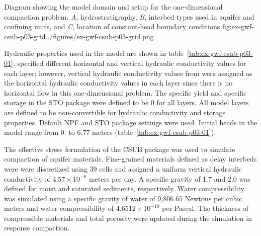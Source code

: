 \begin{StandardFigure}{
                                      Diagram showing the model domain and setup for the one-dimensional 
                                      compaction problem. \textit{A}, hydrostratigraphy, \textit{B}, interbed types 
                                      used in aquifer and confining units, and \textit{C}, location of constant-head 
                                      boundary conditions
                                     }{fig:ex-gwf-csub-p03-grid}{../figures/ex-gwf-csub-p03-grid.png}
\end{StandardFigure}        

 

Hydraulic properties used in the model are shown in table~\ref{tab:ex-gwf-csub-p03-01}.  \cite{sneed2008} specified different horizontal and vertical hydraulic conductivity values for each layer; however, vertical hydraulic conductivity values from \cite{sneed2008} were assigned as the horizontal hydraulic conductivity values in each layer since there is no horizontal flow in this one-dimensional problem. The specific yield and specific storage in the STO package were defined to be 0 for all layers.  All model layers are defined to be non-convertible for hydraulic conductivity and storage properties. Default NPF and STO package settings were used. Initial heads in the model range from 0. to 6.77 meters (table~\ref{tab:ex-gwf-csub-p03-01}).

The effective stress formulation of the CSUB package was used to simulate compaction of aquifer materials.  Fine-grained materials defined as delay interbeds were were discretized using 39 cells and assigned a uniform vertical hydraulic conductivity of $4.57 \times 10^{-6}$ meters per day. A specific gravity of 1.7 and 2.0 was defined for moist and saturated sediments, respectively. Water compressibility was simulated using a specific gravity of water of 9,806.65 Newtons per cubic meters and water compressibility of $4.6512 \times 10^{-10}$ per Pascal. The thickness of compressible materials and total porosity were updated during the simulation in response compaction.

